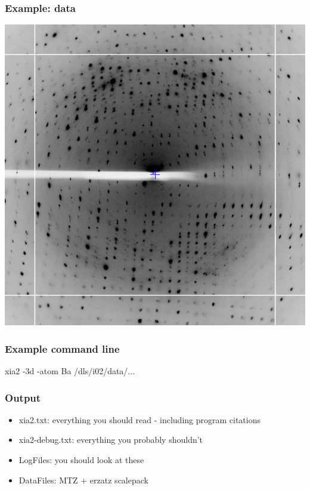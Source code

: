 \documentclass[slides,compress]{beamer}
\begin{document}
\begin{frame}
\frametitle{Example: data}
\begin{center}
\includegraphics[scale=0.35]{figures/3qrn-diffraction.png}
\end{center}
\end{frame}

\begin{frame}
\frametitle{Example command line}
{ \huge
xia2 -3d -atom Ba /dls/i02/data/...
}
\end{frame}

\begin{frame}
\frametitle{Output}
\begin{itemize}
\item{xia2.txt: everything you should read - including program citations}
\item{xia2-debug.txt: everything you probably shouldn't}
\item{LogFiles: you should look at these}
\item{DataFiles: MTZ + erzatz scalepack}
\end{itemize}
\end{frame}
\end{document}
